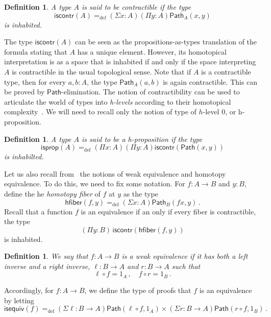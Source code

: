 \documentclass[10pt,a4paper,oneside,reqno]{amsart}
\numberwithin{equation}{section}
\theoremstyle{mythm}
\theoremstyle{mydef}
\newtheorem{definition}[theorem]{Definition}
\theoremstyle{myrmk}
\newcommand{\ie}{\text{i.e.\ }}
\newcommand{\defeq}{=_{\mathrm{def}}}
\newcommand{\co}{\colon}
\newcommand{\iscontr}{\mathsf{iscontr}}
\newcommand{\isprop}{\mathsf{isprop}}
\newcommand{\isequiv}{\mathsf{isequiv}}
\newcommand{\hfiber}{\mathsf{hfiber}}
\newcommand{\Id}{\mathsf{Path}}
\newcommand{\id}[1]{\Id_{#1}}
\begin{document}
\begin{definition}  A type $A$ is said to be \emph{contractible} if the  type 
 \begin{equation}
 \label{eq:contractible}
\iscontr(A) \defeq (\Sigma x:A)(\Pi y:A)\id{A}(x,y)
\end{equation}
is inhabited.
\end{definition} 

The type $\iscontr(A)$ can be seen as the propositions-as-types translation
of the formula stating that $A$ has a unique element. However, its homotopical interpretation 
is as a space that is inhabited if and only if the space interpreting $A$ is contractible in the usual
topological sense. Note that if $A$ is a contractible type, then for every $a, b : A$, the type $\id{A}(a,b)$ is again contractible. 
This can be proved  by $\Id$-elimination. The notion of contractibility can be used to articulate the world of types  into \emph{h-levels} according to their
homotopical complexity~\cite{VoevodskyV:unifc}. We will need to recall only the notion of type of $h$-level 0, or h-proposition.

\begin{definition} A type $A$ is said to be a \emph{h-proposition} if the type
\[
\isprop(A) \defeq (\Pi x : A)(\Pi y : A) \iscontr( \Id(x,y)) 
\]
is inhabilted.
\end{definition}


Let us also recall from~\cite{VoevodskyV:unifc} the notions of weak equivalence and homotopy equivalence. To do this, we need to fix some notation. For $f : A \rightarrow B$ and $y : B$, define the he \emph{homotopy fiber} of $f$ at $y$ as the type
\[
 \hfiber(f,y) \defeq (\Sigma x : A) \id{B}(f x, y) \, .
\]
Recall that a function $f$ is an equivalence if an only if every fiber is contractible, \ie the type
\[
 (\Pi y : B) \,  \iscontr(\hfiber(f,y)) 
\]
is inhabited. 


\begin{definition} \label{thm:weq}  We say that $f : A \rightarrow B$ is a weak equivalence if it has both a left inverse and a right inverse, \ie
$\ell \co B \to A$ and $r \co B \to A$ such that 
\[
 \ell \circ f = 1_A \, ,  \quad  f \circ r = 1_B  \, .
 \]
 \end{definition}
 
 Accordingly, for $f : A \rightarrow B$, we define the type of proofs that $f$ is an equivalence by letting
 \[ 
 \isequiv(f) \defeq (\Sigma \ell \co B \to A) \Id( \ell \circ f, 1_A) \times (\Sigma r \co B \to A) \Id( r \circ f , 1_B) \, .
 \]
\end{document}
